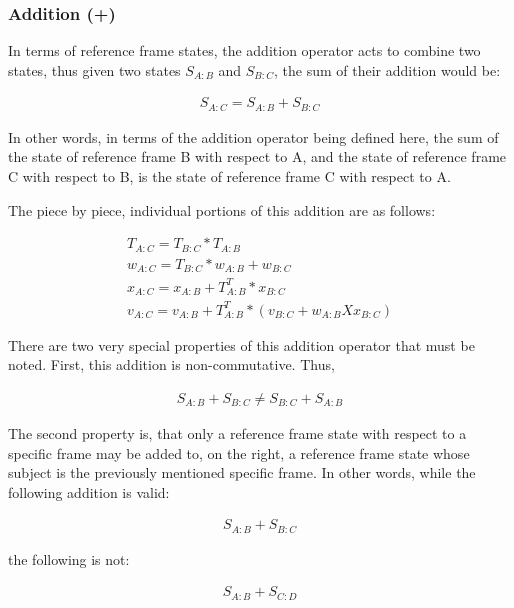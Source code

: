 \subsubsection{Addition (+)}

In terms of reference frame states, the addition operator acts to
combine two states, thus given two states $S_{A:B}$ and $S_{B:C}$, the
sum of their addition would be:

\begin{gather}\label{simple_addition}
S_{A:C} = S_{A:B} + S_{B:C}
\end{gather}

In other words, in terms of the addition operator being defined
here, the sum of the state of reference frame B with respect to A, and
the state of reference frame C with respect to B, is the state of
reference frame C with respect to A.

The piece by piece, individual portions of this addition are
as follows:

\begin{gather}\label{full_addition}
T_{A:C} = T_{B:C} * T_{A:B}  \\
w_{A:C} = T_{B:C} * w_{A:B} + w_{B:C} \\
x_{A:C} = x_{A:B} + T_{A:B}^T * x_{B:C} \\
v_{A:C} = v_{A:B} + T_{A:B}^T * (v_{B:C} + w_{A:B} X x_{B:C})
\end{gather}

There are two very special properties of this addition operator that
must be noted. First, this addition is non-commutative. Thus,

\begin{gather}\label{non_commutative}
S_{A:B} + S_{B:C} \neq S_{B:C} + S_{A:B}
\end{gather}

The second property is, that only a reference frame state with
respect to a specific frame may be added to, on the right, a reference
frame state whose subject is the previously mentioned specific frame. In
other words,
while the following addition is valid:

\begin{gather}\label{valid_addition}
S_{A:B} + S_{B:C}
\end{gather}

the following is not:

\begin{gather}\label{invalid_addition}
S_{A:B} + S_{C:D}
\end{gather}

